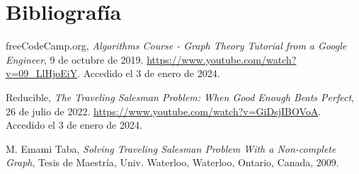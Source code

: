 \documentclass{article}
\begin{document}
	
	\section{Bibliografía}
	\begin{thebibliography}{9}
		freeCodeCamp.org,
		\emph{Algorithms Course - Graph Theory Tutorial from a Google Engineer},
		9 de octubre de 2019.
		\url{https://www.youtube.com/watch?v=09_LlHjoEiY}.
		Accedido el 3 de enero de 2024.
		
		Reducible,
		\emph{The Traveling Salesman Problem: When Good Enough Beats Perfect},
		26 de julio de 2022.
		\url{https://www.youtube.com/watch?v=GiDsjIBOVoA}.
		Accedido el 3 de enero de 2024.
		
		M. Emami Taba,
		\emph{Solving Traveling Salesman Problem With a Non-complete Graph},
		Tesis de Maestría,
		Univ. Waterloo,
		Waterloo, Ontario, Canada,
		2009.
	\end{thebibliography}
	
\end{document}
